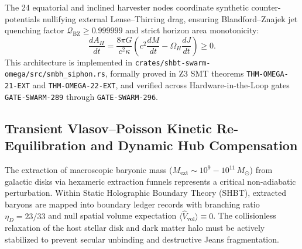 \documentclass[11pt,onecolumn]{article}
\begin{document}
The 24 equatorial and inclined harvester nodes coordinate synthetic counter-potentials nullifying external Lense--Thirring drag, ensuring Blandford--Znajek jet quenching factor $\mathcal{Q}_{\text{BZ}} \ge 0.999999$ and strict horizon area monotonicity:
\begin{equation}
\frac{dA_H}{dt} = \frac{8\pi G}{c^2 \kappa} \left( c^2 \frac{dM}{dt} - \Omega_H \frac{dJ}{dt} \right) \ge 0.
\end{equation}
This architecture is implemented in \texttt{crates/shbt-swarm-omega/src/smbh\_siphon.rs}, formally proved in Z3 SMT theorems \texttt{THM-OMEGA-21-EXT} and \texttt{THM-OMEGA-22-EXT}, and verified across Hardware-in-the-Loop gates \texttt{GATE-SWARM-289} through \texttt{GATE-SWARM-296}.

\FloatBarrier

\subsection{Transient Vlasov--Poisson Kinetic Re-Equilibration and Dynamic Hub Compensation}
\label{subsec:vlasov_poisson_siphon}

The extraction of macroscopic baryonic mass ($M_{\mathrm{ext}} \sim 10^9 - 10^{11}\,M_\odot$) from galactic disks via hexameric extraction funnels represents a critical non-adiabatic perturbation. Within Static Holographic Boundary Theory (SHBT), extracted baryons are mapped into boundary ledger records with branching ratio $\eta_D = 23/33$ and null spatial volume expectation $\langle \hat{V}_{\mathrm{vol}} \rangle \equiv 0$. The collisionless relaxation of the host stellar disk and dark matter halo must be actively stabilized to prevent secular unbinding and destructive Jeans fragmentation.
\end{document}
